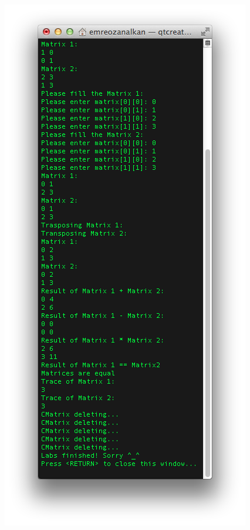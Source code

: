 \documentclass{article}
\begin{document}
\includegraphics[scale=0.8]{Lab8Result.png}
\end{document}
